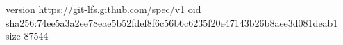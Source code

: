 version https://git-lfs.github.com/spec/v1
oid sha256:74ee5a3a2ee78eae5b52fdef8f6c56b6c6235f20e47143b26b8aee3d081deab1
size 87544
